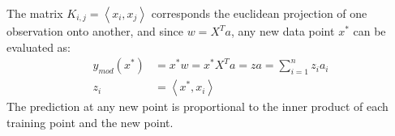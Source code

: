 
The matrix $K_{i,j}=\left\langle x_i,x_j \right\rangle$ corresponds the euclidean projection of one observation onto another, and since $w=X^Ta$, any new data point $x^*$ can be evaluated as:
\begin{align*}
y_{mod}(x^*) &= x^* w = x^* X^Ta =z a = \sum_{i=1}^{n} z_i a_i \\
z_i &=  \left\langle x^*,x_i \right\rangle  
\end{align*}
\pause{}
The prediction at any new point is proportional to the inner product of each training point and the new point.


